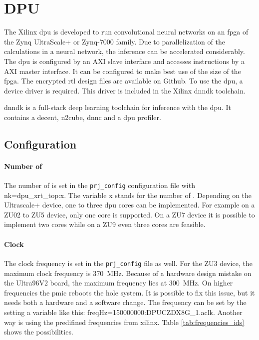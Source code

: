 \section{DPU}
\label{sec:embedded_platform:dpu}
The Xilinx \acrfull{dpu} is developed to run convolutional neural networks on an \acrshort{fpga} of the Zynq UltraScale+ or Zynq-7000 family.
Due to parallelization of the calculations in a neural network, the inference can be accelerated considerably.
The \acrshort{dpu} is configured by an AXI slave interface and accesses instructions by a AXI master interface.
It can be configured to make best use of the size of the \acrshort{fpga}.
The encrypted \acrshort{rtl} design files are available on Github.
To use the \acrshort{dpu}, a device driver is required.
This driver is included in the Xilinx \acrshort{dnndk} toolchain.

\acrfull{dnndk} is a full-stack deep learning toolchain for inference with the \acrlong{dpu}.
It contains a \acrfull{decent}, \acrfull{n2cube}, \acrfull{dnnc} and a \acrshort{dpu} profiler.

\subsection{Configuration}
\label{subsec:embedded_platform:dpu:configuration}
\paragraph{Number of }
The number of  is set in the \texttt{prj\_config} configuration file with nk=dpu\_xrt\_top:x.
The variable x stands for the number of .
Depending on the Ultrascale+ device, one to three \acrshort{dpu} cores can be implemented.
For example on a ZU02 to ZU5 device, only one core is supported.
On a ZU7 device it is possible to implement two cores while on a ZU9 even three cores are feasible.

\paragraph{Clock}
The clock frequency is set in the \texttt{prj\_config} file as well.
For the ZU3 device, the maximum clock frequency is \SI{370}{MHz}.
Because of a hardware design mistake on the Ultra96V2 board, the maximum frequency lies at \SI{300}{MHz}.
On higher frequencies the \acrfull{pmic} reboots the hole system.
It is possible to fix this issue, but it needs both a hardware and a software change.
The frequency can be set  by the setting a variable like this: freqHz=150000000:DPUCZDX8G\_1.aclk.
Another way is using the predifined frequencies from xilinx.
Table \ref{tab:frequencies_ids} shows the possibilities.

